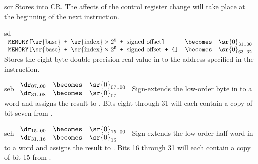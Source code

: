 \begin{instruction}{scr}\label{inst:scr}
    {
      Stores  into \acs{CR}.  The affects of the control
      register change will take place at the beginning of the next
      instruction.
    }
\end{instruction}


\begin{instruction}{sd}
     {\sdopc}
     {
       \begin{math}
         \begin{array}{lcl}
           \texttt{MEMORY[\textrm{\sr{base}} + \(\textrm{\sr{index}}
               \times 2^\texttt{S}\) +  \textrm{signed offset}]}
           & \becomes & {\sr{0}}_{31..00} \\
           \texttt{MEMORY[\textrm{\sr{base}} + \(\textrm{\sr{index}}
               \times 2^\texttt{S}\) +  \textrm{signed offset} + 4]}
           & \becomes & {\sr{0}}_{63..32} \\
         \end{array}
       \end{math}
     }
     {
       Stores the eight byte double precision real value in
        to the address specified in the instruction.
     }
\end{instruction}


\begin{instruction}{seb}
     {\extb}
     {
       \begin{math}
         \begin{array}{lcl}
           {\dr}_{07..00} & \becomes & {\sr{0}}_{07..00} \\
           {\dr}_{31..08} & \becomes & {\sr{0}}_{07} \\
         \end{array}
       \end{math}
     }
     {
       Sign-extends the low-order byte in  to a word
       and assigns the result to \dr.  Bits eight through 31
       will each contain a copy of bit seven from .
     }
\end{instruction}


\begin{instruction}{seh}
     {\exth}
     {
       \begin{math}
         \begin{array}{lcl}
           {\dr}_{15..00} & \becomes & {\sr{0}}_{15..00} \\
           {\dr}_{31..16} & \becomes & {\sr{0}}_{15} \\
         \end{array}
       \end{math}
     }
     {
       Sign-extends the low-order half-word in  to a word and
       assigns the result to \dr.  Bits 16 through 31 will each
       contain a copy of bit 15 from .
     }
\end{instruction}


